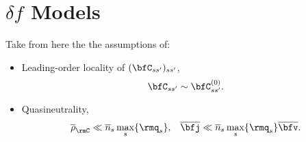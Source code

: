 \section{$\delta\! f$ Models}

    Take from here the the assumptions of:
    \begin{itemize}
        \item  Leading-order locality of $(\bfC_{ss'})_{ss'}$,
        \begin{equation}
            \bfC_{ss'}  \sim  \bfC_{ss'}^{(0)}.
        \end{equation}
        \item  Quasineutrality,
        \begin{align}
            \overline{\rho}_{\rmC}  \ll \overline{n}_{s}\max_{s}\{\rmq_{s}\},  &&
            \overline{\bfj}         \ll  \overline{n}_{s}\max_{s}\{\rmq_{s}\}\overline{\bfv}.
        \end{align}
    \end{itemize}

    \line

